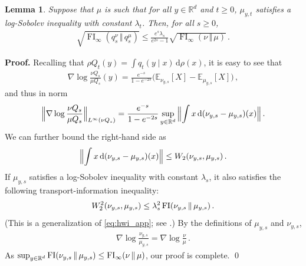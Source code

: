 \documentclass[12pt]{article}
\newcommand{\RR}{\mathbb{R}}
\newcommand{\R}{\RR}
\newcommand{\E}{\mathbb{E}}
\newcommand{\1}{\mathds{1}}
\newcommand*{\rd}{\mathrm{d}}
\newcommand*{\dd}{\, \rd}
\newcommand{\mmid}{\,\Vert\,}
\renewenvironment{proof}{\noindent\textbf{Proof.}\hspace*{.3em}}{\qed \vspace{.1in}}
\newcommand{\infFI}{\operatorname{FI}_\infty}
\theoremstyle{plain}
\newtheorem{lemma}[theorem]{Lemma}
\theoremstyle{definition}
\theoremstyle{remark}
\begin{document}
\begin{lemma}\label{lem:stronger_lemma}
Suppose that $\mu$ is such that for all $y \in \R^d$ and $t \geq 0$, $\mu_{y,t}$ satisfies a log-Sobolev inequality with constant $\lambda_t$. Then, for all $s \geq 0$,
\begin{align*}
    \sqrt{\infFI(q^\nu_s\mmid q^\mu_s)} \leq \frac{e^{s}\lambda_s}{e^{2s}-1} \sqrt{\infFI(\nu \mmid \mu)}\,.
\end{align*}
\end{lemma}
\begin{proof}
Recalling that $\rho Q_t(y) = \int q_t(y\mid x)\dd\rho(x)$, it is easy to see that 
\begin{align*}
    \nabla \log \frac{\nu Q_s}{\mu Q_{s}}(y) = \frac{e^{-s}}{1-e^{-2s}} \bigl( \E_{\nu_{y,s}}[X] - \E_{\mu_{y,s}}[X]\bigr)\,,
\end{align*}
and thus in norm
\begin{align*}
    \Bigl\|\nabla \log \frac{\nu Q_s}{\mu Q_s}\Bigr\|_{L^\infty(\nu Q_s)} = \frac{e^{-s}}{1-e^{-2s}} \sup_{y \in \R^d}{\Bigl\lVert\int x \dd( \nu_{y,s} - \mu_{y,s})(x)\Bigr\rVert} \,.
\end{align*}
We can further bound the right-hand side as
\begin{align*}
    \Bigl\|\int x \dd( \nu_{y,s} - \mu_{y,s})(x)\Bigr\| \leq  W_2(\nu_{y,s},\mu_{y,s})\,.
\end{align*}
If $\mu_{y,s}$ satisfies a log-Sobolev inequality with constant $\lambda_s$, it also satisfies the following transport-information inequality:
\begin{align*}
    W_2^2(\nu_{y,s},\mu_{y,s}) \leq \lambda_s^2\, {\rm FI}(\nu_{y,s}\mmid\mu_{y,s})\,.
\end{align*}
(This is a generalization of \eqref{eq:hwi_app}; see \cite{gentil2020entropic}.) By the definitions of $\mu_{y,s}$ and $\nu_{y,s}$, 
\begin{align*}
    \nabla \log \frac{\nu_{y,s}}{\mu_{y,s}} = \nabla \log \frac{\nu}{\mu}\,.
\end{align*}
As $\sup_{y\in\R^d} {\rm FI}(\nu_{y,s}\mmid \mu_{y,s}) \leq \infFI(\nu\mmid\mu)$, our proof is complete.
\end{proof}
\end{document}
